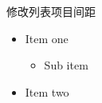 \documentclass{ctexbeamer}
\begin{document}
\begin{frame}{修改列表项目间距}

\begin{itemize}
  \item Item one
  \begin{itemize}
    \item Sub item
  \end{itemize}
\item Item two
\end{itemize}

\end{frame}
\end{document}
